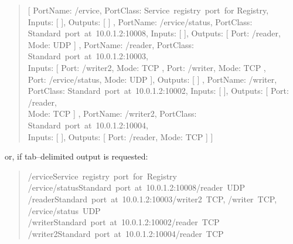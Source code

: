 \begin{quote}
[ \textbraceleft{} \dquote{}PortName\dquote{}: \dquote{}/\textdollar{}ervice\dquote{},
\dquote{}PortClass\dquote{}: \dquote{}Service~registry~port~for
\squote{}Registry\squote{}\dquote{}, \\
\dquote{}Inputs\dquote{}: [  ], \dquote{}Outputs\dquote{}: [  ] \textbraceright{},
\textbraceleft{} \dquote{}PortName\dquote{}:
\dquote{}/\textdollar{}ervice/status\dquote{}, \dquote{}PortClass\dquote{}:\\
\dquote{}Standard~port~at~10.0.1.2:10008\dquote{}, \dquote{}Inputs\dquote{}: [  ],
\dquote{}Outputs\dquote{}: [ \textbraceleft{} \dquote{}Port\dquote{}:
\dquote{}/reader\dquote{}, \\
\dquote{}Mode\dquote{}: \dquote{}UDP\dquote{} \textbraceright{} ] \textbraceright{},
\textbraceleft{} \dquote{}PortName\dquote{}: \dquote{}/reader\dquote{},
\dquote{}PortClass\dquote{}: \dquote{}Standard~port~at~10.0.1.2:10003\dquote{},\\
\dquote{}Inputs\dquote{}: [ \textbraceleft{} \dquote{}Port\dquote{}:
\dquote{}/writer2\dquote{}, \dquote{}Mode\dquote{}: \dquote{}TCP\dquote{}
\textbraceright{}, \textbraceleft{} \dquote{}Port\dquote{}: \dquote{}/writer\dquote{},
\dquote{}Mode\dquote{}: \dquote{}TCP\dquote{} \textbraceright{},\\
\textbraceleft{} \dquote{}Port\dquote{}: \dquote{}/\textdollar{}ervice/status\dquote{},
\dquote{}Mode\dquote{}: \dquote{}UDP\dquote{} \textbraceright{} ],
\dquote{}Outputs\dquote{}: [  ] \textbraceright{}, \textbraceleft{}
\dquote{}PortName\dquote{}: \dquote{}/writer\dquote{},\\
\dquote{}PortClass\dquote{}: \dquote{}Standard~port~at~10.0.1.2:10002\dquote{},
\dquote{}Inputs\dquote{}: [  ], \dquote{}Outputs\dquote{}: [ \textbraceleft{}
\dquote{}Port\dquote{}: \dquote{}/reader\dquote{},\\
\dquote{}Mode\dquote{}: \dquote{}TCP\dquote{} \textbraceright{} ] \textbraceright{},
\textbraceleft{} \dquote{}PortName\dquote{}: \dquote{}/writer2\dquote{},
\dquote{}PortClass\dquote{}: \dquote{}Standard~port~at~10.0.1.2:10004\dquote{},\\
\dquote{}Inputs\dquote{}: [  ], \dquote{}Outputs\dquote{}: [ \textbraceleft{}
\dquote{}Port\dquote{}: \dquote{}/reader\dquote{}, \dquote{}Mode\dquote{}:
\dquote{}TCP\dquote{} \textbraceright{} ] \textbraceright{} ]
\end{quote}
or, if tab--delimited output is requested:
\begin{quote}
/\textdollar{}ervice\pseudotab{}Service~registry~port~for~\squote{}Registry\squote{}\\		
/\textdollar{}ervice/status\pseudotab{}Standard~port~at~10.0.1.2:10008\pseudotab{}/reader~UDP\\
/reader\pseudotab{}Standard~port~at~10.0.1.2:10003\pseudotab{}/writer2~TCP,
/writer~TCP, /\textdollar{}ervice/status~UDP\\
/writer\pseudotab{}Standard~port~at~10.0.1.2:10002\pseudotab{}/reader~TCP\\
/writer2\pseudotab{}Standard~port~at~10.0.1.2:10004\pseudotab{}/reader~TCP
\end{quote}

